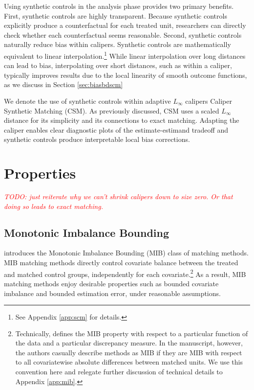 \documentclass{article}
\newcommand{\note}[1]{\textcolor{red}{\textit{#1}}}
\begin{document}
Using synthetic controls in the analysis phase provides two primary benefits.
First, synthetic controls are highly transparent.
Because synthetic controls explicitly produce a counterfactual for each treated unit, researchers can directly check whether each counterfactual seems reasonable.
Second, synthetic controls naturally reduce bias within calipers.
Synthetic controls are mathematically equivalent to linear interpolation.\footnote{See Appendix \ref{app:scm} for details.}
While linear interpolation over long distances can lead to bias, interpolating over short distances, such as within a caliper, typically improves results due to the local linearity of smooth outcome functions, as we discuss in Section \ref{sec:biasbdscm}

We denote the use of synthetic controls within adaptive $L_\infty$ calipers Caliper Synthetic Matching (CSM).
As previously discussed, CSM uses a scaled $L_\infty$ distance for its simplicity and its connections to exact matching.
Adapting the caliper enables clear diagnostic plots of the estimate-estimand tradeoff and synthetic controls produce interpretable local bias corrections.

\section{Properties}
\label{sec:properties}

\note{TODO: just reiterate why we can't shrink calipers down to size zero. Or that doing so leads to exact matching.}

\subsection{Monotonic Imbalance Bounding}
\label{sec:mib}

\citet{iacus2011multivariate} introduces the Monotonic Imbalance Bounding (MIB) class of matching methods.
MIB matching methods directly control covariate balance between the treated and matched control groups, independently for each covariate.\footnote{Technically, \cite{iacus2011multivariate} defines the MIB property with respect to a particular function of the data and a particular discrepancy measure.
In the manuscript, however, the authors casually describe methods as MIB if they are MIB with respect to all covariatewise absolute differences between matched units.
We use this convention here and relegate further discussion of technical details to Appendix \ref{app:mib}.}
As a result, MIB matching methods enjoy desirable properties such as bounded covariate imbalance and bounded estimation error, under reasonable assumptions.
\end{document}

